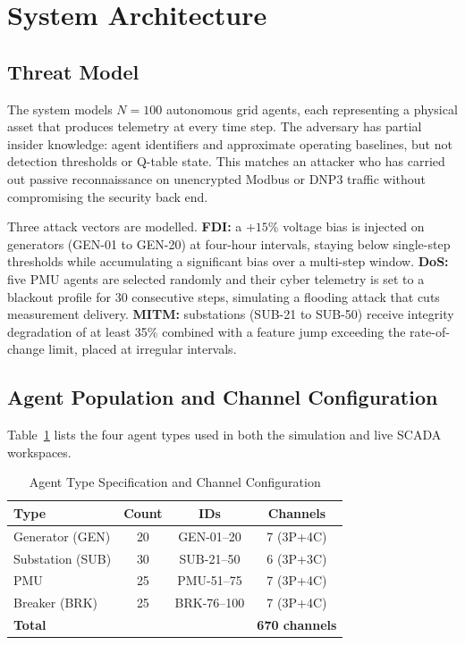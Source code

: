 \documentclass[conference,a4paper]{IEEEtran}
\begin{document}
\section{System Architecture}

\subsection{Threat Model}

The system models $N=100$ autonomous grid agents, each representing a physical asset that produces telemetry at every time step. The adversary has partial insider knowledge: agent identifiers and approximate operating baselines, but not detection thresholds or Q-table state. This matches an attacker who has carried out passive reconnaissance on unencrypted Modbus or DNP3 traffic without compromising the security back end.

Three attack vectors are modelled. \textbf{FDI:} a $+15\%$ voltage bias is injected on generators (GEN-01 to GEN-20) at four-hour intervals, staying below single-step thresholds while accumulating a significant bias over a multi-step window. \textbf{DoS:} five PMU agents are selected randomly and their cyber telemetry is set to a blackout profile for 30 consecutive steps, simulating a flooding attack that cuts measurement delivery. \textbf{MITM:} substations (SUB-21 to SUB-50) receive integrity degradation of at least 35\% combined with a feature jump exceeding the rate-of-change limit, placed at irregular intervals.

\subsection{Agent Population and Channel Configuration}

Table~\ref{tab:agents} lists the four agent types used in both the simulation and live SCADA workspaces.

\begin{table}[htbp]
\caption{Agent Type Specification and Channel Configuration}
\begin{center}
\small
\begin{tabular}{|l|c|c|c|}
\hline
\textbf{Type} & \textbf{Count} & \textbf{IDs} & \textbf{Channels} \\
\hline
Generator (GEN) & 20 & GEN-01--20 & 7 (3P+4C) \\
\hline
Substation (SUB) & 30 & SUB-21--50 & 6 (3P+3C) \\
\hline
PMU & 25 & PMU-51--75 & 7 (3P+4C) \\
\hline
Breaker (BRK) & 25 & BRK-76--100 & 7 (3P+4C) \\
\hline
\multicolumn{3}{|l|}{\textbf{Total}} & \textbf{670 channels} \\
\hline
\end{tabular}
\label{tab:agents}
\end{center}
\end{table}
\end{document}
